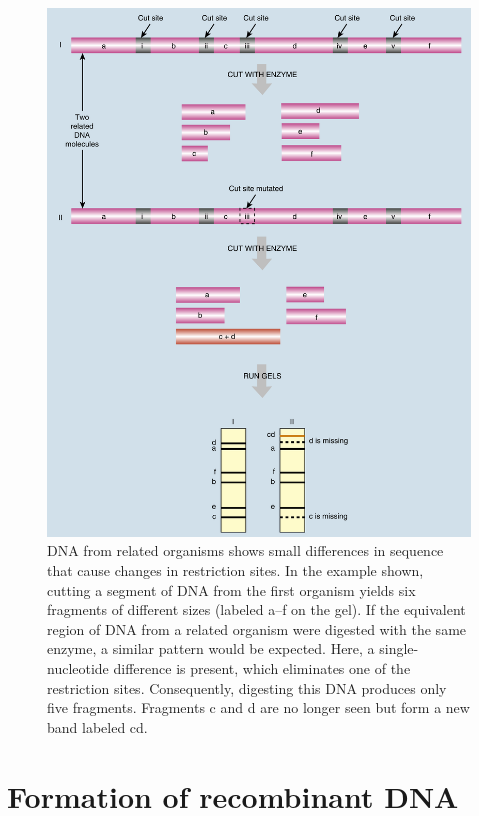 \documentclass[11pt,dvipsnames,ignorenonframetext,aspectratio=169]{beamer}
\begin{document}
\begin{frame}{}
\protect\hypertarget{section-19}{}

\begin{figure}
\includegraphics[width=0.35\linewidth]{./../images/rflp_analysis} \caption{DNA from related organisms shows small differences in sequence that cause changes in restriction sites. In the example shown, cutting a segment of DNA from the first organism yields six fragments of different sizes (labeled a–f on the gel). If the equivalent region of DNA from a related organism were digested with the same enzyme, a similar pattern would be expected. Here, a single-nucleotide difference is present, which eliminates one of the restriction sites. Consequently, digesting this DNA produces only five fragments. Fragments c and d are no longer seen but form a new band labeled cd.}\label{fig:rflp-analysis}
\end{figure}

\end{frame}

\hypertarget{formation-of-recombinant-dna}{%
\section{Formation of recombinant
DNA}\label{formation-of-recombinant-dna}}
\end{document}
